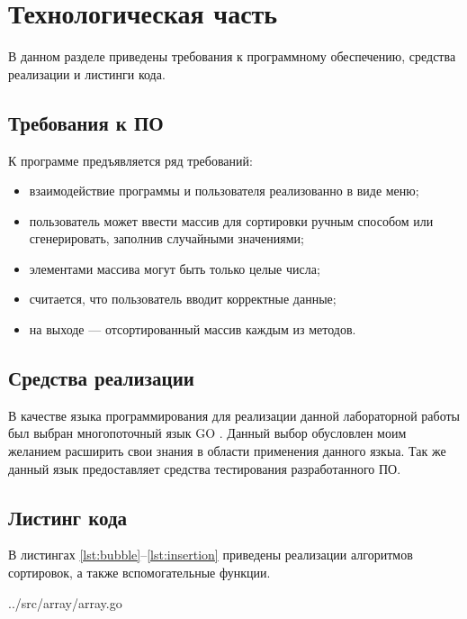 \chapter{Технологическая часть}

В данном разделе приведены требования к программному обеспечению, средства реализации и листинги кода.

\section{Требования к ПО}

К программе предъявляется ряд требований:
\begin{itemize}
	\item взаимодействие программы и пользователя реализованно в виде меню;
	\item пользователь может ввести массив для сортировки ручным способом или сгенерировать, заполнив случайными значениями;
	\item элементами массива могут быть только целые числа;
	\item считается, что пользователь вводит корректные данные;
	\item на выходе — отсортированный массив каждым из методов.
\end{itemize}

\section{Средства реализации}

В качестве языка программирования для реализации данной лабораторной работы был выбран многопоточный язык GO \cite{golang}. Данный выбор обусловлен моим желанием расширить свои знания в области применения данного язкыа. Так же данный язык предоставляет средства тестирования разработанного ПО.

\section{Листинг кода}

В листингах \ref{lst:bubble}--\ref{lst:insertion} приведены реализации алгоритмов сортировок, а также вспомогательные функции.

\clearpage

\captionsetup{singlelinecheck = false, justification=raggedright}

\begin{lstinputlisting}[
	caption={Алгоритм сортировки пузырьком},
	label={lst:bubble},
	style={go},
	linerange={25-38},
	]{../src/array/array.go}
\end{lstinputlisting}

